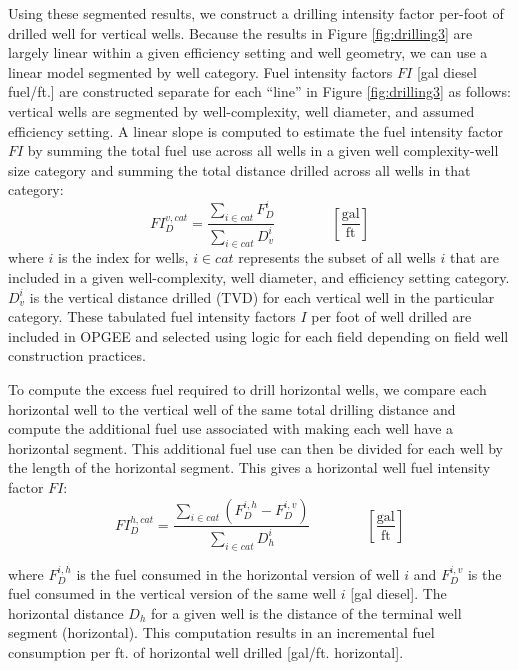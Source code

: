 \documentclass[11pt]{report}
\newcommand{\eqnunitfrac}[2]{\quad\quad \scriptstyle{\left[\frac{\text{#1}}{\text{#2}}\right]}}
\begin{document}
Using these segmented results, we construct a drilling intensity factor per-foot of drilled well for vertical wells.  Because the results in Figure \ref{fig:drilling3} are largely linear within a given efficiency setting and well geometry, we can use a linear model segmented by well category. Fuel intensity factors $FI$ [gal diesel fuel/ft.] are constructed separate for each ``line'' in Figure \ref{fig:drilling3} as follows: vertical wells are segmented by well-complexity, well diameter, and assumed efficiency setting.  A linear slope is computed to estimate the fuel intensity factor $FI$ by summing the total fuel use across all wells in a given well complexity-well size category and summing the total distance drilled across all wells in that category:
\begin{equation}
FI_{D}^{v,cat} = \frac{\sum_{i \in cat} F_{D}^{i}}{\sum_{i \in cat} D_{v}^{i}}
\quad\quad\eqnunitfrac{gal}{ft}
\end{equation}
where $i$ is the index for wells, $i \in cat$ represents the subset of all wells $i$ that are included in a given well-complexity, well diameter, and efficiency setting category.  $D_{v}^{i}$ is the vertical distance drilled (TVD) for each vertical well in the particular category.  These tabulated fuel intensity factors $I$ per foot of well drilled are included in OPGEE and selected using logic for each field depending on field well construction practices.


To compute the excess fuel required to drill horizontal wells, we compare each horizontal well to the vertical well of the same total drilling distance and compute the additional fuel use associated with making each well have a horizontal segment.  This additional fuel use can then be divided for each well by the length of the horizontal segment. This gives a horizontal well fuel intensity factor $FI$:
\begin{equation}
FI_{D}^{h,cat} = \frac{\sum_{i \in cat} \left(F_{D}^{i,h} - F_{D}^{i,v} \right)}{\sum_{i \in cat} D_{h}^{i}} \quad\quad\eqnunitfrac{gal}{ft}
\end{equation}

where $F_{D}^{i,h}$ is the fuel consumed in the horizontal version of well $i$ and $F_{D}^{i,v}$ is the fuel consumed in the vertical version of the same well $i$ [gal diesel].  The horizontal distance $D_{h}$ for a given well is the distance of the terminal well segment (horizontal).  This computation results in an incremental fuel consumption per ft. of horizontal well drilled [gal/ft. horizontal]. 
\end{document}

